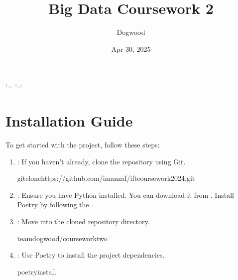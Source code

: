 \documentclass[letterpaper,10pt,english]{sphinxmanual}
\title{Big Data \sphinxhyphen{} Coursework 2}
\date{Apr 30, 2025}
\author{Dogwood}
\begin{document}
\ifdefined\shorthandoff
  \ifnum\catcode`\=\string=\active\shorthandoff{=}\fi
  \ifnum\catcode`\"=\active{}\fi
\fi

\pagestyle{empty}
\sphinxmaketitle
\pagestyle{plain}
\sphinxtableofcontents
\pagestyle{normal}
\label{\detokenize{index::doc}}


\sphinxstepscope


\chapter{Installation Guide}
\label{\detokenize{installation:installation-guide}}\label{\detokenize{installation::doc}}
\sphinxAtStartPar
To get started with the project, follow these steps:
\begin{enumerate}
%
\item {} 
\sphinxAtStartPar
{}: If you haven’t already, clone the repository using Git.

\begin{sphinxVerbatim}[commandchars=\\\{\}]
gitclonehttps://github.com/imanzaf/ift\PYGZus{}coursework\PYGZus{}2024.git
\end{sphinxVerbatim}

\item {} 
\sphinxAtStartPar
{}:
\sphinxhyphen{} Ensure you have Python installed. You can download it from .
\sphinxhyphen{} Install Poetry by following the .

\item {} 
\sphinxAtStartPar
{}: Move into the cloned repository directory.

\begin{sphinxVerbatim}[commandchars=\\\{\}]
team\PYGZus{}dogwood/coursework\PYGZus{}two
\end{sphinxVerbatim}

\item {} 
\sphinxAtStartPar
{}: Use Poetry to install the project dependencies.

\begin{sphinxVerbatim}[commandchars=\\\{\}]
poetryinstall
\end{sphinxVerbatim}


\end{enumerate}
\end{document}
